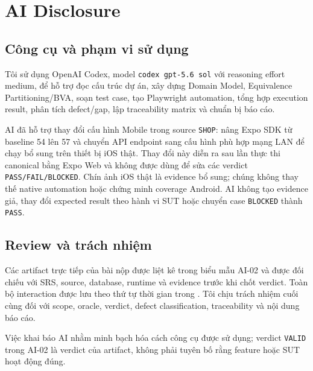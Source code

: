 \chapter{AI Disclosure}

\section{Công cụ và phạm vi sử dụng}

Tôi sử dụng OpenAI Codex, model \texttt{codex gpt-5.6 sol} với reasoning effort
medium, để hỗ trợ đọc cấu trúc dự án, xây dựng Domain Model, Equivalence
Partitioning/BVA, soạn test case, tạo Playwright automation, tổng hợp execution
result, phân tích defect/gap, lập traceability matrix và chuẩn bị báo cáo.

AI đã hỗ trợ thay đổi cấu hình Mobile trong source \texttt{SHOP}: nâng Expo SDK
từ baseline 54 lên 57 và chuyển API endpoint sang cấu hình phù hợp mạng LAN để
chạy bổ sung trên thiết bị iOS thật. Thay đổi này diễn ra sau lần thực thi
canonical bằng Expo Web và không được dùng để sửa các verdict
\texttt{PASS/FAIL/BLOCKED}. Chín ảnh iOS thật là evidence bổ sung; chúng không
thay thế native automation hoặc chứng minh coverage Android. AI không tạo
evidence giả, thay đổi expected result theo hành vi SUT hoặc chuyển case
\texttt{BLOCKED} thành \texttt{PASS}.

\section{Review và trách nhiệm}

Các artifact trực tiếp của bài nộp được liệt kê trong biểu mẫu AI-02 và được
đối chiếu với SRS, source, database, runtime và evidence trước khi chốt verdict.
Toàn bộ interaction được lưu theo thứ tự thời gian trong
. Tôi chịu trách nhiệm cuối cùng đối với scope, oracle,
verdict, defect classification, traceability và nội dung báo cáo.

Việc khai báo AI nhằm minh bạch hóa cách công cụ được sử dụng; verdict
\texttt{VALID} trong AI-02 là verdict của artifact, không phải tuyên bố rằng
feature hoặc SUT hoạt động đúng.
